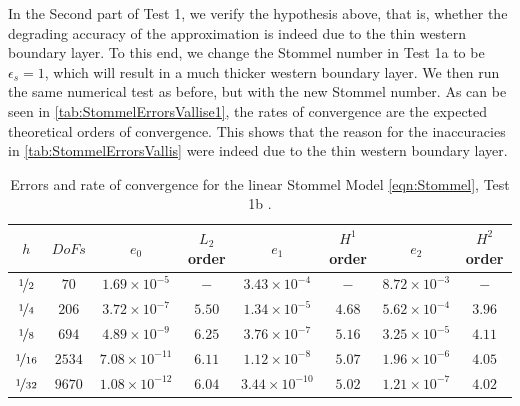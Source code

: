 In the Second part of Test 1, we verify the hypothesis above, that is, whether
the degrading accuracy of the approximation is indeed due to the thin western
boundary layer. To this end, we change the Stommel number in Test 1a to be
$\epsilon_s=1$, which will result in a much thicker western boundary layer. We
then run the same numerical test as before, but with the new Stommel number. As
can be seen in \autoref{tab:StommelErrorsVallise1}, the rates of convergence are
the expected theoretical orders of convergence. This shows that the reason for
the inaccuracies in \autoref{tab:StommelErrorsVallis} were indeed due to the
thin western boundary layer.

\begin{table}%
\begin{center}
\begin{tabular}{|c|c|c|c|c|c|c|c|}%
  \hline
  $h$ & $DoFs$ & $e_0$ & $L_2$ order & $e_1$ & $H^1$ order & $e_2$ & $H^2$ order \\[0.2em] %
  \hline
  $\nicefrac{1}{2}$ & $70$ & $1.69\times 10^{-5}$ & $-$ & $3.43\times 10^{-4}$ & $-$ & $8.72\times 10^{-3}$ & $-$ \\[0.2em] %
  $\nicefrac{1}{4}$ & $206$ & $3.72\times 10^{-7}$ & $5.50$ & $1.34\times 10^{-5}$ & $4.68$ & $5.62\times 10^{-4}$ & $3.96$ \\[0.2em] %
  $\nicefrac{1}{8}$ & $694$ & $4.89\times 10^{-9}$ & $6.25$ & $3.76\times 10^{-7}$ & $5.16$ & $3.25\times 10^{-5}$ & $4.11$ \\[0.2em] %
  $\nicefrac{1}{16}$ & $2534$ & $7.08\times 10^{-11}$ & $6.11$ & $1.12\times 10^{-8}$ & $5.07$ & $1.96\times 10^{-6}$ & $4.05$ \\[0.2em] %
  $\nicefrac{1}{32}$ & $9670$ & $1.08\times 10^{-12}$ & $6.04$ & $3.44\times 10^{-10}$ & $5.02$ & $1.21\times 10^{-7}$ & $4.02$ \\[0.2em] %
  \hline
\end{tabular}
\end{center}
\caption{Errors and rate of convergence for the linear Stommel Model
  \eqref{eqn:Stommel}, Test 1b \cite{Vallis06}.}
\label{tab:StommelErrorsVallise1}
\end{table}

